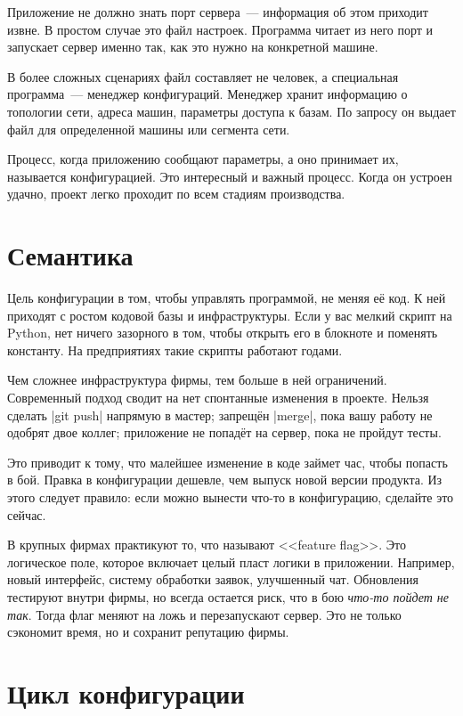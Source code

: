 Приложение не должно знать порт сервера~--- информация об этом приходит извне. В
простом случае это файл настроек. Программа читает из него порт и запускает
сервер именно так, как это нужно на конкретной машине.


В более сложных сценариях файл составляет не человек, а специальная
программа~--- менеджер конфигураций. Менеджер хранит информацию о топологии
сети, адреса машин, параметры доступа к базам. По запросу он выдает файл для
определенной машины или сегмента сети.

Процесс, когда приложению сообщают параметры, а оно принимает их, называется
конфигурацией. Это интересный и важный процесс. Когда он устроен удачно, проект
легко проходит по всем стадиям производства.

\section{Семантика}

Цель конфигурации в том, чтобы управлять программой, не меняя е\"{е} код. К ней
приходят с ростом кодовой базы и инфраструктуры. Если у вас мелкий скрипт на
Python, нет ничего зазорного в том, чтобы открыть его в блокноте и поменять
константу. На предприятиях такие скрипты работают годами.

Чем сложнее инфраструктура фирмы, тем больше в ней ограничений. Современный
подход сводит на нет спонтанные изменения в проекте. Нельзя сделать \spverb|git push|
напрямую в мастер; запрещ\"{е}н \spverb|merge|, пока вашу работу не одобрят
двое коллег; приложение не попад\"{е}т на сервер, пока не пройдут тесты.

Это приводит к тому, что малейшее изменение в коде займет час, чтобы попасть в
бой. Правка в конфигурации дешевле, чем выпуск новой версии продукта. Из этого
следует правило: если можно вынести что-то в конфигурацию, сделайте это сейчас.


В крупных фирмах практикуют то, что называют <<feature flag>>. Это логическое
поле, которое включает целый пласт логики в приложении. Например, новый
интерфейс, систему обработки заявок, улучшенный чат. Обновления тестируют внутри
фирмы, но всегда остается риск, что в бою \emph{что-то пойдет не так}. Тогда
флаг меняют на ложь и перезапускают сервер. Это не только сэкономит время, но и
сохранит репутацию фирмы.

\section{Цикл конфигурации}

